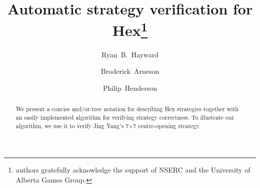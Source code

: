 \documentclass{llncs}
\newcommand{\board}[2]{\mbox{$#1$$\times$$#2$}}
\begin{document}
\frontmatter
\pagestyle{headings}  %

\title{Automatic strategy verification for Hex\thanks{
authors gratefully acknowledge the support of NSERC
and the University of Alberta Games Group.}}

\author{Ryan~B.~Hayward \and
        Broderick~Arneson \and
        Philip~Henderson}

\maketitle

\begin{abstract}
We present a concise and/or-tree notation
for describing Hex strategies
together with an easily implemented algorithm
for verifying strategy correctness.
To illustrate our algorithm, we use it to verify 
Jing Yang's \board{7}{7} centre-opening strategy.
\end{abstract}




\end{document}

